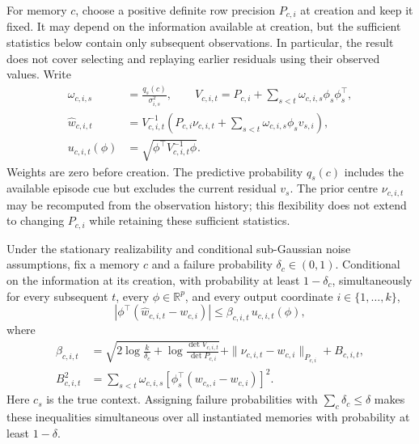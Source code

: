 For memory $c$, choose a positive definite row precision $P_{c,i}$ at creation and keep it fixed. It may depend on the information available at creation, but the sufficient statistics below contain only subsequent observations. In particular, the result does not cover selecting and replaying earlier residuals using their observed values. Write
\begin{align}
\omega_{c,i,s}&=\frac{q_s(c)}{\sigma_{i,s}^2},\qquad
V_{c,i,t}=P_{c,i}+\sum_{s<t}\omega_{c,i,s}\phi_s\phi_s^\top,\label{eq:weighted-design}\\
\widehat w_{c,i,t}&=V_{c,i,t}^{-1}\left(P_{c,i}\nu_{c,i,t}
+\sum_{s<t}\omega_{c,i,s}\phi_s v_{s,i}\right),\label{eq:weighted-estimate}\\
u_{c,i,t}(\phi)&=\sqrt{\phi^\top V_{c,i,t}^{-1}\phi}.\nonumber
\end{align}
Weights are zero before creation. The predictive probability $q_s(c)$ includes the available episode cue but excludes the current residual $v_s$. The prior centre $\nu_{c,i,t}$ may be recomputed from the observation history; this flexibility does not extend to changing $P_{c,i}$ while retaining these sufficient statistics.

\begin{theorem}
\label{thm:confidence}
Under the stationary realizability and conditional sub-Gaussian noise assumptions, fix a memory $c$ and a failure probability $\delta_c\in(0,1)$. Conditional on the information at its creation, with probability at least $1-\delta_c$, simultaneously for every subsequent $t$, every $\phi\in\mathbb R^p$, and every output coordinate $i\in\{1,\ldots,k\}$,
\begin{equation}
\left|\phi^\top(\widehat w_{c,i,t}-w_{c,i})\right|
\leq \beta_{c,i,t}\,u_{c,i,t}(\phi),\label{eq:memory-confidence}
\end{equation}
where
\begin{align}
\beta_{c,i,t}
&=\sqrt{2\log\frac{k}{\delta_c}
+\log\frac{\det V_{c,i,t}}{\det P_{c,i}}}
+\|\nu_{c,i,t}-w_{c,i}\|_{P_{c,i}}+B_{c,i,t},\label{eq:memory-radius}\\
B_{c,i,t}^2
&=\sum_{s<t}\omega_{c,i,s}
\left[\phi_s^\top(w_{c_s,i}-w_{c,i})\right]^2.\label{eq:contamination}
\end{align}
Here $c_s$ is the true context. Assigning failure probabilities with $\sum_c\delta_c\leq\delta$ makes these inequalities simultaneous over all instantiated memories with probability at least $1-\delta$.
\end{theorem}

